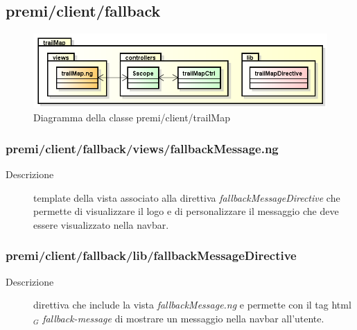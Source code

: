 \clearpage
\subsection{premi/client/fallback}
\begin{figure}[H]
\begin{center}
\includegraphics[scale=0.70]{img/diapkg/trailMap.png}
\caption{Diagramma della classe premi/client/trailMap}
\end{center}
\end{figure}

\subsubsection{premi/client/fallback/views/fallbackMessage.ng}

\begin{description}
\item[Descrizione] \hfill
	template della vista associato alla direttiva \textit{fallbackMessageDirective} che permette di visualizzare il logo e di personalizzare il messaggio che deve essere visualizzato nella navbar.
\end{description}

\subsubsection{premi/client/fallback/lib/fallbackMessageDirective}

\begin{description}
\item[Descrizione] \hfill
	direttiva che include la vista \textit{fallbackMessage.ng} e permette con il tag html$_G$ \textit{fallback-message} di mostrare un messaggio nella navbar all'utente.
\end{description}

